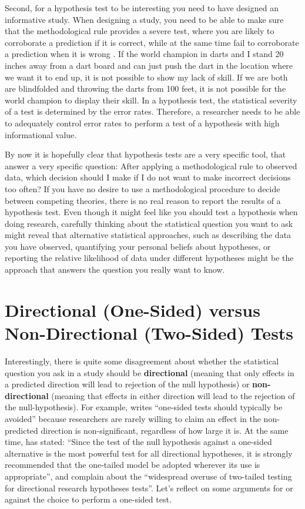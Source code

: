 \documentclass[
  oneside]{krantz}
\begin{document}
Second, for a hypothesis test to be interesting you need to have designed an informative study. When designing a study, you need to be able to make sure that the methodological rule provides a severe test, where you are likely to corroborate a prediction if it is correct, while at the same time fail to corroborate a prediction when it is wrong \citep{mayo_statistical_2018}. If the world champion in darts and I stand 20 inches away from a dart board and can just push the dart in the location where we want it to end up, it is not possible to show my lack of skill. If we are both are blindfolded and throwing the darts from 100 feet, it is not possible for the world champion to display their skill. In a hypothesis test, the statistical severity of a test is determined by the error rates. Therefore, a researcher needs to be able to adequately control error rates to perform a test of a hypothesis with high informational value.

By now it is hopefully clear that hypothesis tests are a very specific tool, that answer a very specific question: After applying a methodological rule to observed data, which decision should I make if I do not want to make incorrect decisions too often? If you have no desire to use a methodological procedure to decide between competing theories, there is no real reason to report the results of a hypothesis test. Even though it might feel like you should test a hypothesis when doing research, carefully thinking about the statistical question you want to ask might reveal that alternative statistical approaches, such as describing the data you have observed, quantifying your personal beliefs about hypotheses, or reporting the relative likelihood of data under different hypotheses might be the approach that answers the question you really want to know.

\hypertarget{onesided}{%
\section{Directional (One-Sided) versus Non-Directional (Two-Sided) Tests}\label{onesided}}

Interestingly, there is quite some disagreement about whether the statistical question you ask in a study should be \textbf{directional} (meaning that only effects in a predicted direction will lead to rejection of the null hypothesis) or \textbf{non-directional} (meaning that effects in either direction will lead to the rejection of the null-hypothesis). For example, \citet{baguley_serious_2012} writes ``one-sided tests should typically be avoided'' because researchers are rarely willing to claim an effect in the non-predicted direction is non-significant, regardless of how large it is. At the same time, \citet{jones_test_1952} has stated: ``Since the test of the null hypothesis against a one-sided alternative is the most powerful test for all directional hypotheses, it is strongly recommended that the one-tailed model be adopted wherever its use is appropriate'', and \citet{cho_is_2013} complain about the ``widespread overuse of two-tailed testing for directional research hypotheses tests''. Let's reflect on some arguments for or against the choice to perform a one-sided test.
\end{document}
